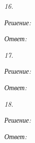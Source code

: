 
\emph{16.}

\vspace*{2em}
\emph{Решение:}

\vspace*{2em}
\emph{Ответ: }


\emph{17.}

\vspace*{2em}
\emph{Решение:}

\vspace*{2em}
\emph{Ответ: }


\emph{18.}

\vspace*{2em}
\emph{Решение:}

\vspace*{2em}
\emph{Ответ: }



